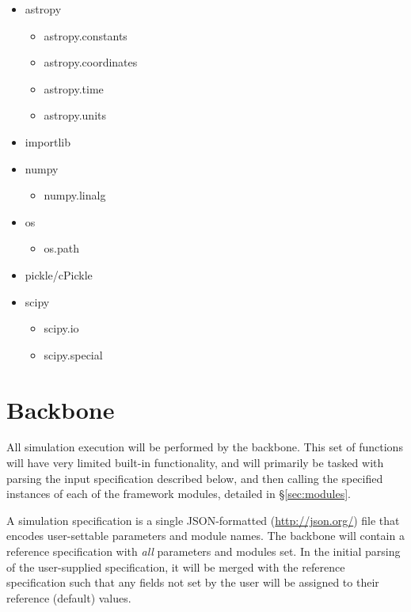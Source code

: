 \documentclass[cleanfoot]{asme2ej}
\begin{document}
\begin{itemize}
    \item astropy
        \begin{itemize}
            \item astropy.constants
            \item astropy.coordinates
            \item astropy.time
            \item astropy.units
        \end{itemize}
    \item importlib
    \item numpy
        \begin{itemize}
            \item numpy.linalg 
        \end{itemize}
    \item os
        \begin{itemize}
            \item os.path 
        \end{itemize}
    \item pickle/cPickle
    \item scipy
        \begin{itemize}
            \item scipy.io
            \item scipy.special
        \end{itemize}
\end{itemize}


\section{Backbone}
All simulation execution will be performed by the backbone.  This set of functions will have very limited built-in functionality, and will primarily be tasked with parsing the input specification described below, and then calling the specified instances of each of the framework modules, detailed in \S\ref{sec:modules}.

A simulation specification is a single JSON-formatted (\url{http://json.org/}) file that encodes user-settable parameters and module names.  The backbone will contain a reference specification with \emph{all} parameters and modules set.  In the initial parsing of the user-supplied specification, it will be merged with the reference specification such that any fields not set by the user will be assigned to their reference (default) values. 
\end{document}
